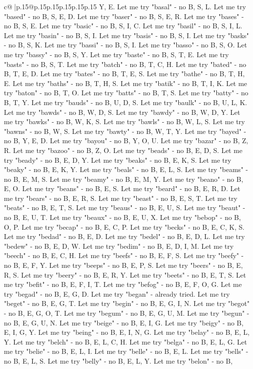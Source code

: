 \documentclass{article}
\begin{document}
{\begin{supertabular}{c@{$\;$}|p{.15\linewidth}@{}p{.15\linewidth}p{.15\linewidth}p{.15\linewidth}p{.15\linewidth}p{.15\linewidth}}
{{{Y, E. Let me try "basal" {-} no B, S, L. Let me try "based" {-} no B, S, E, D. Let me try "baser" {-} no B, S, E, R. Let me try "bases" {-} no B, S, E. Let me try "basic" {-} no B, S, I, C. Let me try "basil" {-} no B, S, I, L. Let me try "basin" {-} no B, S, I. Let me try "basis" {-} no B, S, I. Let me try "basks" {-} no B, S, K. Let me try "bassi" {-} no B, S, I. Let me try "basso" {-} no B, S, O. Let me try "bassy" {-} no B, S, Y. Let me try "baste" {-} no B, S, T, E. Let me try "basts" {-} no B, S, T. Let me try "batch" {-} no B, T, C, H. Let me try "bated" {-} no B, T, E, D. Let me try "bates" {-} no B, T, E, S. Let me try "bathe" {-} no B, T, H, E. Let me try "baths" {-} no B, T, H, S. Let me try "batik" {-} no B, T, I, K. Let me try "baton" {-} no B, T, O. Let me try "batts" {-} no B, T, S. Let me try "batty" {-} no B, T, Y. Let me try "bauds" {-} no B, U, D, S. Let me try "baulk" {-} no B, U, L, K. Let me try "bawds" {-} no B, W, D, S. Let me try "bawdy" {-} no B, W, D, Y. Let me try "bawks" {-} no B, W, K, S. Let me try "bawls" {-} no B, W, L, S. Let me try "bawns" {-} no B, W, S. Let me try "bawty" {-} no B, W, T, Y. Let me try "bayed" {-} no B, Y, E, D. Let me try "bayou" {-} no B, Y, O, U. Let me try "bazar" {-} no B, Z, R. Let me try "bazoo" {-} no B, Z, O. Let me try "beads" {-} no B, E, D, S. Let me try "beady" {-} no B, E, D, Y. Let me try "beaks" {-} no B, E, K, S. Let me try "beaky" {-} no B, E, K, Y. Let me try "beals" {-} no B, E, L, S. Let me try "beams" {-} no B, E, M, S. Let me try "beamy" {-} no B, E, M, Y. Let me try "beano" {-} no B, E, O. Let me try "beans" {-} no B, E, S. Let me try "beard" {-} no B, E, R, D. Let me try "bears" {-} no B, E, R, S. Let me try "beast" {-} no B, E, S, T. Let me try "beats" {-} no B, E, T, S. Let me try "beaus" {-} no B, E, U, S. Let me try "beaut" {-} no B, E, U, T. Let me try "beaux" {-} no B, E, U, X. Let me try "bebop" {-} no B, O, P. Let me try "becap" {-} no B, E, C, P. Let me try "becks" {-} no B, E, C, K, S. Let me try "bedad" {-} no B, E, D. Let me try "bedel" {-} no B, E, D, L. Let me try "bedew" {-} no B, E, D, W. Let me try "bedim" {-} no B, E, D, I, M. Let me try "beech" {-} no B, E, C, H. Let me try "beefs" {-} no B, E, F, S. Let me try "beefy" {-} no B, E, F, Y. Let me try "beeps" {-} no B, E, P, S. Let me try "beers" {-} no B, E, R, S. Let me try "beery" {-} no B, E, R, Y. Let me try "beets" {-} no B, E, T, S. Let me try "befit" {-} no B, E, F, I, T. Let me try "befog" {-} no B, E, F, O, G. Let me try "begad" {-} no B, E, G, D. Let me try "began" {-} already tried. Let me try "beget" {-} no B, E, G, T. Let me try "begin" {-} no B, E, G, I, N. Let me try "begot" {-} no B, E, G, O, T. Let me try "begum" {-} no B, E, G, U, M. Let me try "begun" {-} no B, E, G, U, N. Let me try "beige" {-} no B, E, I, G. Let me try "beigy" {-} no B, E, I, G, Y. Let me try "being" {-} no B, E, I, N, G. Let me try "belay" {-} no B, E, L, Y. Let me try "belch" {-} no B, E, L, C, H. Let me try "belga" {-} no B, E, L, G. Let me try "belie" {-} no B, E, L, I. Let me try "belle" {-} no B, E, L. Let me try "bells" {-} no B, E, L, S. Let me try "belly" {-} no B, E, L, Y. Let me try "belon" {-} no B, }}}
\end{supertabular}}
\end{document}
